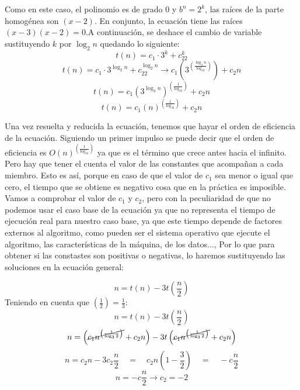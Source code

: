 \documentclass[10pt,a4paper,spanish]{report}
\begin{document}
\begin{center}
  Como en este caso, el polinomio es de grado 0 y $b^n = 2^k$, las raíces de la parte homogénea son $(x-2)$. En conjunto, la ecuación tiene las raíces $(x-3)(x-2) = 0$.A continuación, se deshace el cambio de variable sustituyendo $k$ por $\log_2 n$ quedando lo siguiente:
  \begin{displaymath}
    t(n) = c_1\cdot 3^k + c_22^k
  \end{displaymath}
  \begin{displaymath}
    t(n) = c_1\cdot 3^{\log_2n} + c_22^{\log_2n} \longrightarrow c_1\left(3^{\left(\frac{\log_3n}{\log_32}\right)}\right) + c_2n
  \end{displaymath}
  \begin{displaymath}
    t(n) = c_1\left(3^{\log_3n}\right)^{\left(\frac{1}{\log_32}\right)} + c_2n
  \end{displaymath}
  \begin{displaymath}
    t(n) = c_1\left(n\right)^{\left(\frac{1}{\log_32}\right)} + c_2n
  \end{displaymath}
\end{center}

Una vez resuelta y reducida la ecuación, tenemos que hayar el orden de eficiencia de la ecuación. Siguiendo un primer impulso se puede decir que el orden de eficiencia es $O\left(n\right)^{\left(\frac{1}{\log_32}\right)}$ ya que es el término que crece antes hacia el infinito. Pero hay que tener el cuenta el valor de las constantes que acompañan a cada miembro. Esto es así, porque en caso de que el valor de $c_1$ sea menor o igual que cero, el tiempo que se obtiene es negativo cosa que en la práctica es imposible. Vamos a comprobar el valor de $c_1$ y $c_2$, pero con la peculiaridad de que no podemos usar el caso base de la ecuación ya que no representa el tiempo de ejecución real para nuestro caso base, ya que este tiempo depende de factores externos al algoritmo, como pueden ser el sistema operativo que ejecute el algoritmo, las características de la máquina, de los datos$\ldots$, Por lo que para obtener si las constastes son positivas o negativas, lo haremos sustituyendo las soluciones en la ecuación general:
\begin{center}
\begin{displaymath}
  n = t(n) - 3t\left(\frac{n}{2}\right)
\end{displaymath}
Teniendo en cuenta que $\left(\frac{1}{2}\right) = \frac{1}{3}$:
\begin{displaymath}
  n = t(n) - 3t\left(\frac{n}{2}\right)
\end{displaymath}
\begin{displaymath}
  n = \left(\cancel{c_1n^{\left(\frac{1}{\log_32}\right)}} + c_2n\right) - 3t\left(\cancel{c_1n^{\left(\frac{1}{\log_32}\right)}} + c_2n\right)
\end{displaymath}
\begin{displaymath}
  n = c_2n -3c_2\frac{n}{2} \quad = \quad c_2n\left(1 - \frac{3}{2}\right) \quad = \quad -c\frac{n}{2}
\end{displaymath}
\begin{displaymath}
  n = -c\frac{n}{2} \longrightarrow c_2 = -2
\end{displaymath}
\end{center}
\end{document}
